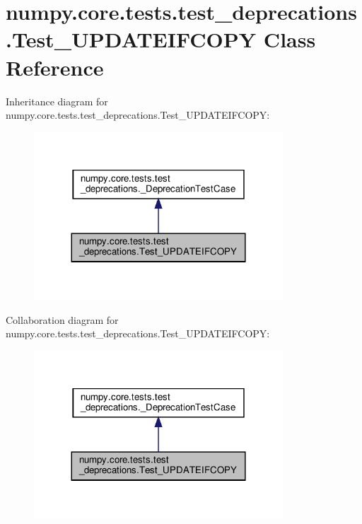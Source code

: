 \hypertarget{classnumpy_1_1core_1_1tests_1_1test__deprecations_1_1Test__UPDATEIFCOPY}{}\section{numpy.\+core.\+tests.\+test\+\_\+deprecations.\+Test\+\_\+\+U\+P\+D\+A\+T\+E\+I\+F\+C\+O\+PY Class Reference}
\label{classnumpy_1_1core_1_1tests_1_1test__deprecations_1_1Test__UPDATEIFCOPY}


Inheritance diagram for numpy.\+core.\+tests.\+test\+\_\+deprecations.\+Test\+\_\+\+U\+P\+D\+A\+T\+E\+I\+F\+C\+O\+PY\+:
\nopagebreak
\begin{figure}[H]
\begin{center}
\leavevmode
\includegraphics[width=264pt]{classnumpy_1_1core_1_1tests_1_1test__deprecations_1_1Test__UPDATEIFCOPY__inherit__graph}
\end{center}
\end{figure}


Collaboration diagram for numpy.\+core.\+tests.\+test\+\_\+deprecations.\+Test\+\_\+\+U\+P\+D\+A\+T\+E\+I\+F\+C\+O\+PY\+:
\nopagebreak
\begin{figure}[H]
\begin{center}
\leavevmode
\includegraphics[width=264pt]{classnumpy_1_1core_1_1tests_1_1test__deprecations_1_1Test__UPDATEIFCOPY__coll__graph}
\end{center}
\end{figure}
